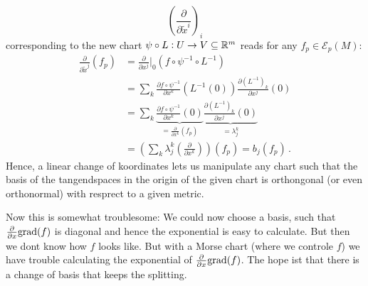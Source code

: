 $$\left(\frac{\partial}{\partial \tilde{x} ^i}\right)_i$$
corresponding to the new chart $\psi\circ L: U\to V\subseteq \mathbb{R}^m$ reads for any $f_p\in \mathcal{E}_p(M)$:
\begin{align*}
    \frac{\partial}{\partial \tilde{x} ^j}(f_p)
    & =\frac{\partial}{\partial x^j} \Big|_{0}(f\circ\psi^{-1}\circ L^{-1}) \\
    &= \sum _k \frac{\partial f\circ \psi^{-1}}{\partial x^k}(L^{-1}(0))\frac{\partial (L^{-1})_k}{\partial x^j}(0)\\
    &= \sum _k \underbrace{\frac{\partial f\circ \psi^{-1}}{\partial x^k}(0)}_{=\frac{\partial}{\partial x^k}(f_p)}  \underbrace{\frac{\partial (L^{-1})_k}{\partial x^j}(0)}_{=\lambda^k_j}\\
     & =\left(\sum_k \lambda^k_j(\frac{\partial}{\partial x^k})\right)(f_p)=b_j(f_p) \, .
\end{align*} Hence, a linear change of koordinates lets us manipulate any chart such that the basis of the tangendspaces in the origin of the given chart is orthongonal (or even orthonormal) with resprect to a given metric.


Now this is somewhat troublesome:
We could now choose a basis, such that $\frac{\partial}{\partial x}\mathrm{grad}(f)$ is diagonal and hence the exponential is easy to calculate. But then we dont know how $f$ looks like. But with a Morse chart (where we controle $f$) we have trouble calculating the exponential of $\frac{\partial}{\partial x}\mathrm{grad}(f)$. The hope ist that there is a change of basis that keeps the splitting.

